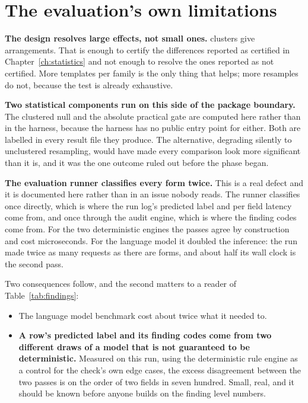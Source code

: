 \section{The evaluation's own limitations}

\textbf{The design resolves large effects, not small ones.} \vClusters{}
clusters give \vArrangements{} arrangements. That is enough to certify the
differences reported as certified in Chapter~\ref{ch:statistics} and not enough
to resolve the ones reported as not certified. More templates per family is the
only thing that helps; more resamples do not, because the test is already
exhaustive.

\textbf{Two statistical components run on this side of the package boundary.}
The clustered null and the absolute practical gate are computed here rather than
in the harness, because the harness has no public entry point for either. Both
are labelled in every result file they produce. The alternative, degrading
silently to unclustered resampling, would have made every comparison look more
significant than it is, and it was the one outcome ruled out before the phase
began.

\textbf{The evaluation runner classifies every form twice.} This is a real defect
and it is documented here rather than in an issue nobody reads. The runner
classifies once directly, which is where the run log's predicted label and per
field latency come from, and once through the audit engine, which is where the
finding codes come from. For the two deterministic engines the passes agree by
construction and cost microseconds. For the language model it doubled the
inference: the run made twice as many requests as there are forms, and about half
its wall clock is the second pass.

Two consequences follow, and the second matters to a reader of
Table~\ref{tab:findings}:

\begin{itemize}
  \item The language model benchmark cost about twice what it needed to.
  \item \textbf{A row's predicted label and its finding codes come from two
    different draws of a model that is not guaranteed to be deterministic.}
    Measured on this run, using the deterministic rule engine as a control for
    the check's own edge cases, the excess disagreement between the two passes is
    on the order of two fields in seven hundred. Small, real, and it should be
    known before anyone builds on the finding level numbers.
\end{itemize}

